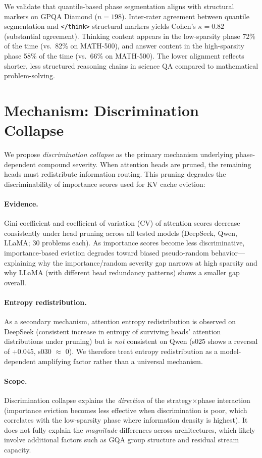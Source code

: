 \documentclass[11pt,a4paper]{article}
\begin{document}
We validate that quantile-based phase segmentation aligns with structural markers on GPQA Diamond ($n=198$). Inter-rater agreement between quantile segmentation and \texttt{</think>} structural markers yields Cohen's $\kappa = 0.82$ (substantial agreement). Thinking content appears in the low-sparsity phase 72\% of the time (vs.\ 82\% on MATH-500), and answer content in the high-sparsity phase 58\% of the time (vs.\ 66\% on MATH-500). The lower alignment reflects shorter, less structured reasoning chains in science QA compared to mathematical problem-solving.

\section{Mechanism: Discrimination Collapse}
\label{sec:mechanism}

We propose \emph{discrimination collapse} as the primary mechanism underlying phase-dependent compound severity. When attention heads are pruned, the remaining heads must redistribute information routing. This pruning degrades the discriminability of importance scores used for KV cache eviction:

\paragraph{Evidence.} Gini coefficient and coefficient of variation (CV) of attention scores decrease consistently under head pruning across all tested models (DeepSeek, Qwen, LLaMA; 30 problems each). As importance scores become less discriminative, importance-based eviction degrades toward biased pseudo-random behavior---explaining why the importance/random severity gap narrows at high sparsity and why LLaMA (with different head redundancy patterns) shows a smaller gap overall.

\paragraph{Entropy redistribution.} As a secondary mechanism, attention entropy redistribution is observed on DeepSeek (consistent increase in entropy of surviving heads' attention distributions under pruning) but is \emph{not} consistent on Qwen (s025 shows a reversal of +0.045, s030 $\approx$ 0). We therefore treat entropy redistribution as a model-dependent amplifying factor rather than a universal mechanism.

\paragraph{Scope.} Discrimination collapse explains the \emph{direction} of the strategy$\times$phase interaction (importance eviction becomes less effective when discrimination is poor, which correlates with the low-sparsity phase where information density is highest). It does not fully explain the \emph{magnitude} differences across architectures, which likely involve additional factors such as GQA group structure and residual stream capacity.
\end{document}
